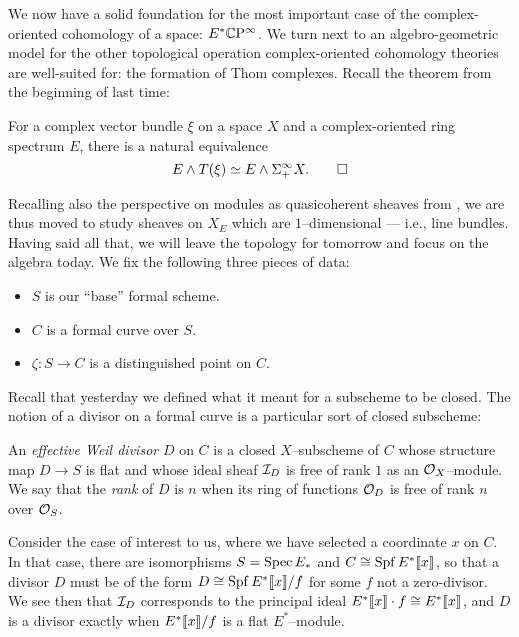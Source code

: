 We now have a solid foundation for the most important case of the complex-oriented cohomology of a space: $E^* \mathbb{C}\mathrm P^\infty$.  We turn next to an algebro-geometric model for the other topological operation complex-oriented cohomology theories are well-suited for: the formation of Thom complexes.  Recall the theorem from the beginning of last time:
\begin{theorem}
For a complex vector bundle $\xi$ on a space $X$ and a complex-oriented ring spectrum $E$, there is a natural equivalence \[E \wedge T(\xi) \simeq E \wedge \Sigma^\infty_+ X. \qed\]
\end{theorem}
Recalling also the perspective on modules as quasicoherent sheaves from , we are thus moved to study sheaves on $X_E$ which are $1$--dimensional --- i.e., line bundles.  Having said all that, we will leave the topology for tomorrow and focus on the algebra today.  We fix the following three pieces of data:
\begin{itemize}
\item $S$ is our ``base'' formal scheme.
\item $C$ is a formal curve over $S$.
\item $\zeta: S \to C$ is a distinguished point on $C$.
\end{itemize}

Recall that yesterday we defined what it meant for a subscheme to be closed.  The notion of a divisor on a formal curve is a particular sort of closed subscheme:

\begin{definition}
An \textit{effective Weil divisor} $D$ on $C$ is a closed $X$--subscheme of $C$ whose structure map $D \to S$ is flat and whose ideal sheaf $\mathcal{I}_D$ is free of rank $1$ as an $\mathcal{O}_X$--module.  We say that the \textit{rank} of $D$ is $n$ when its ring of functions $\mathcal{O}_D$ is free of rank $n$ over $\mathcal{O}_S$.
\end{definition}

Consider the case of interest to us, where we have selected a coordinate $x$ on $C$.  In that case, there are isomorphisms $S = \operatorname{Spec} E_*$ and $C \cong \operatorname{Spf} E^*\llbracket{x}\rrbracket$, so that a divisor $D$ must be of the form $D \cong \operatorname{Spf} E^*\llbracket{x}\rrbracket / f$ for some $f$ not a zero-divisor.  We see then that $\mathcal{I}_D$ corresponds to the principal ideal $E^*\llbracket{x}\rrbracket \cdot f \cong E^*\llbracket{x}\rrbracket$, and $D$ is a divisor exactly when $E^*\llbracket{x}\rrbracket / f$ is a flat $E^*$--module.

